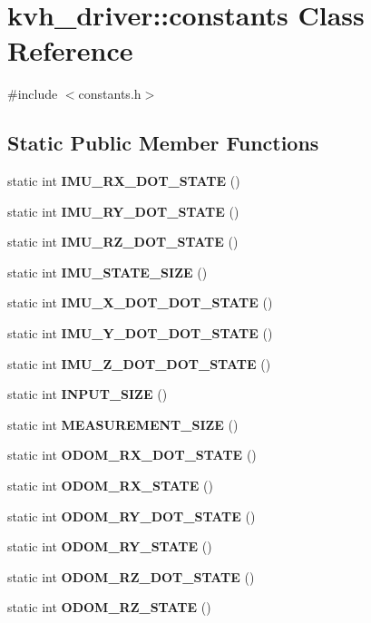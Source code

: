 \section{kvh\-\_\-driver\-:\-:constants \-Class \-Reference}
\label{classkvh__driver_1_1constants}


{\ttfamily \#include $<$constants.\-h$>$}

\subsection*{\-Static \-Public \-Member \-Functions}
\begin{DoxyCompactItemize}
\item 
static int {\bf \-I\-M\-U\-\_\-\-R\-X\-\_\-\-D\-O\-T\-\_\-\-S\-T\-A\-T\-E} ()
\item 
static int {\bf \-I\-M\-U\-\_\-\-R\-Y\-\_\-\-D\-O\-T\-\_\-\-S\-T\-A\-T\-E} ()
\item 
static int {\bf \-I\-M\-U\-\_\-\-R\-Z\-\_\-\-D\-O\-T\-\_\-\-S\-T\-A\-T\-E} ()
\item 
static int {\bf \-I\-M\-U\-\_\-\-S\-T\-A\-T\-E\-\_\-\-S\-I\-Z\-E} ()
\item 
static int {\bf \-I\-M\-U\-\_\-\-X\-\_\-\-D\-O\-T\-\_\-\-D\-O\-T\-\_\-\-S\-T\-A\-T\-E} ()
\item 
static int {\bf \-I\-M\-U\-\_\-\-Y\-\_\-\-D\-O\-T\-\_\-\-D\-O\-T\-\_\-\-S\-T\-A\-T\-E} ()
\item 
static int {\bf \-I\-M\-U\-\_\-\-Z\-\_\-\-D\-O\-T\-\_\-\-D\-O\-T\-\_\-\-S\-T\-A\-T\-E} ()
\item 
static int {\bf \-I\-N\-P\-U\-T\-\_\-\-S\-I\-Z\-E} ()
\item 
static int {\bf \-M\-E\-A\-S\-U\-R\-E\-M\-E\-N\-T\-\_\-\-S\-I\-Z\-E} ()
\item 
static int {\bf \-O\-D\-O\-M\-\_\-\-R\-X\-\_\-\-D\-O\-T\-\_\-\-S\-T\-A\-T\-E} ()
\item 
static int {\bf \-O\-D\-O\-M\-\_\-\-R\-X\-\_\-\-S\-T\-A\-T\-E} ()
\item 
static int {\bf \-O\-D\-O\-M\-\_\-\-R\-Y\-\_\-\-D\-O\-T\-\_\-\-S\-T\-A\-T\-E} ()
\item 
static int {\bf \-O\-D\-O\-M\-\_\-\-R\-Y\-\_\-\-S\-T\-A\-T\-E} ()
\item 
static int {\bf \-O\-D\-O\-M\-\_\-\-R\-Z\-\_\-\-D\-O\-T\-\_\-\-S\-T\-A\-T\-E} ()
\item 
static int {\bf \-O\-D\-O\-M\-\_\-\-R\-Z\-\_\-\-S\-T\-A\-T\-E} ()
\item 

\end{DoxyCompactItemize}

